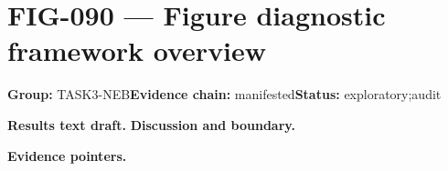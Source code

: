 \clearpage
\section{FIG-090 --- Figure diagnostic framework overview}
\label{figpage:fig-090}
\textbf{Group:} TASK3-NEB\quad \textbf{Evidence chain:} manifested\quad \textbf{Status:} exploratory;audit

\textbf{Results text draft.} 
\textbf{Discussion and boundary.} 


\textbf{Evidence pointers.}



\vfill
